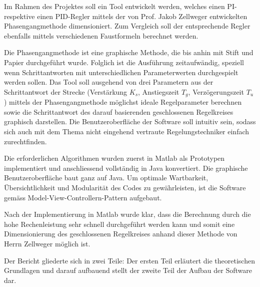 Im   Rahmen  des   Projektes  soll   ein  Tool   entwickelt  werden,   welches
einen   PI-  respektive   einen   PID-Regler  mittels   der  von   Prof. Jakob
Zellweger  entwickelten  Phasengangmethode  
dimensioniert. Zum Vergleich  soll der entsprechende Regler  ebenfalls mittels
verschiedenen Faustformeln berechnet werden.

Die Phasengangmethode ist eine graphische Methode, die bis anhin mit Stift und
Papier  durchgef\"uhrt wurde. Folglich  ist die  Ausf\"uhrung zeitaufw\"andig,
speziell   wenn   Schrittantworten   mit   unterschiedlichen   Parameterwerten
durchgespielt werden sollen. Das  Tool soll ausgehend von  drei Parametern aus
der  Schrittantwort  der  Strecke (Verst\"arkung  $K_s$,  Anstiegszeit  $T_g$,
Verz\"ogerungszeit  $T_u$) mittels  der  Phasengangmethode m\"oglichst  ideale
Regelparameter  berechnen  sowie  die Schrittantwort  des  darauf  basierenden
geschlossenen Regelkreises graphisch  darstellen. Die Benutzeroberfl\"ache der
Software soll  intuitiv sein, sodass sich  auch mit dem Thema  nicht eingehend
vertraute Regelungstechniker einfach zurechtfinden.

Die  erforderlichen  Algorithmen  wurden   zuerst  in  Matlab  als  Prototypen
implementiert  und   anschliessend  vollst\"andig   in  Java  konvertiert. Die  graphische   Benutzeroberfl\"ache  baut  ganz  auf
Java. Um optimale Wartbarkeit, \"Ubersichtlichkeit und Modularit\"at des Codes
zu gew\"ahrleisten,  ist die Software  gem\"ass Model-View-Controllern-Pattern
aufgebaut.

Nach der Implementierung  in Matlab wurde klar, dass die  Berechnung durch die
hohe Rechenleistung  sehr schnell  durchgef\"uhrt werden  kann und  somit eine
Dimensionierung des geschlossenen Regelkreises anhand dieser Methode von Herrn
Zellweger m\"oglich ist.

Der  Bericht gliederte  sich in  zwei Teile: Der  ersten Teil  erl\"autert die
theoretischen  Grundlagen und  darauf  aufbauend stellt  der  zweite Teil  der
Aufbau der Software dar.
